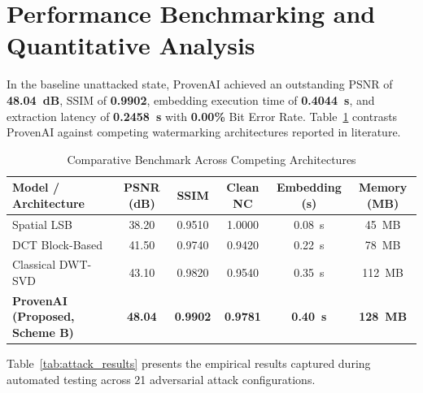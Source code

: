 \documentclass[12pt,a4paper]{report}
\begin{document}
\section{Performance Benchmarking and Quantitative Analysis}
In the baseline unattacked state, ProvenAI achieved an outstanding PSNR of \textbf{48.04~dB}, SSIM of \textbf{0.9902}, embedding execution time of \textbf{0.4044~s}, and extraction latency of \textbf{0.2458~s} with \textbf{0.00\%} Bit Error Rate. Table~\ref{tab:comp_bench} contrasts ProvenAI against competing watermarking architectures reported in literature.

\begin{table}[htbp]
\centering
\small
\caption{Comparative Benchmark Across Competing Architectures}
\label{tab:comp_bench}
\begin{tabularx}{\textwidth}{lccccc}
\toprule
\textbf{Model / Architecture} & \textbf{PSNR (dB)} & \textbf{SSIM} & \textbf{Clean NC} & \textbf{Embedding (s)} & \textbf{Memory (MB)} \\
\midrule
Spatial LSB~\cite{cox2002digital} & 38.20 & 0.9510 & 1.0000 & 0.08~s & 45~MB \\
DCT Block-Based~\cite{lai2010digital} & 41.50 & 0.9740 & 0.9420 & 0.22~s & 78~MB \\
Classical DWT-SVD~\cite{liu2002svd} & 43.10 & 0.9820 & 0.9540 & 0.35~s & 112~MB \\
\textbf{ProvenAI (Proposed, Scheme B)} & \textbf{48.04} & \textbf{0.9902} & \textbf{0.9781} & \textbf{0.40~s} & \textbf{128~MB} \\
\bottomrule
\end{tabularx}
\end{table}

Table~\ref{tab:attack_results} presents the empirical results captured during automated testing across 21 adversarial attack configurations.
\end{document}
